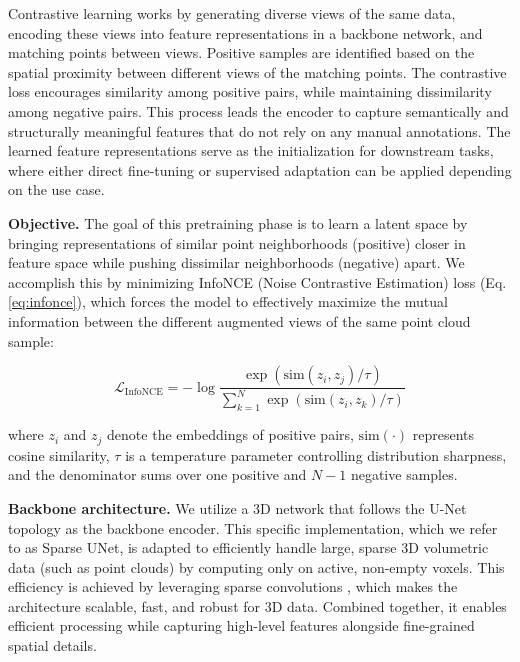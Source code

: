 \documentclass[review,authoryear]{elsarticle}
\begin{document}
Contrastive learning works by generating diverse views of the same data, encoding these views into feature representations in a backbone network, and matching points between views. Positive samples are identified based on the spatial proximity between different views of the matching points. The contrastive loss encourages similarity among positive pairs, while maintaining dissimilarity among negative pairs. This process leads the encoder to capture semantically and structurally meaningful features that do not rely on any manual annotations. The learned feature representations serve as the initialization for downstream tasks, where either direct fine-tuning or supervised adaptation can be applied depending on the use case. 


\textbf{Objective.} The goal of this pretraining phase is to learn a latent space by bringing representations of similar point neighborhoods (positive) closer in feature space while pushing dissimilar neighborhoods (negative) apart. We accomplish this by minimizing InfoNCE (Noise Contrastive Estimation) loss (Eq. \ref{eq:infonce}), which forces the model to effectively maximize the mutual information between the different augmented views of the same point cloud sample:

\begin{equation}
\mathcal{L}_{\text{InfoNCE}} = -\log \frac{\exp(\mathrm{sim}(z_i, z_j) / \tau)}{\sum_{k=1}^{N} \exp(\mathrm{sim}(z_i, z_k) / \tau)}
\label{eq:infonce}
\end{equation}

where $z_i$ and $z_j$ denote the embeddings of positive pairs, $\mathrm{sim}(\cdot)$ represents cosine similarity, $\tau$ is a temperature parameter controlling distribution sharpness, and the denominator sums over one positive and $N-1$ negative samples.



\textbf{Backbone architecture.} We utilize a 3D network that follows the U-Net topology \citep{cciccek20163d} as the backbone encoder. This specific implementation, which we refer to as Sparse UNet, is adapted to efficiently handle large, sparse 3D volumetric data (such as point clouds) by computing only on active, non-empty voxels. This efficiency is achieved by leveraging sparse convolutions \citep{graham20183d,choy20194d}, which makes the architecture scalable, fast, and robust for 3D data. Combined together, it enables efficient processing while capturing high-level features alongside fine-grained spatial details. 
\end{document}
